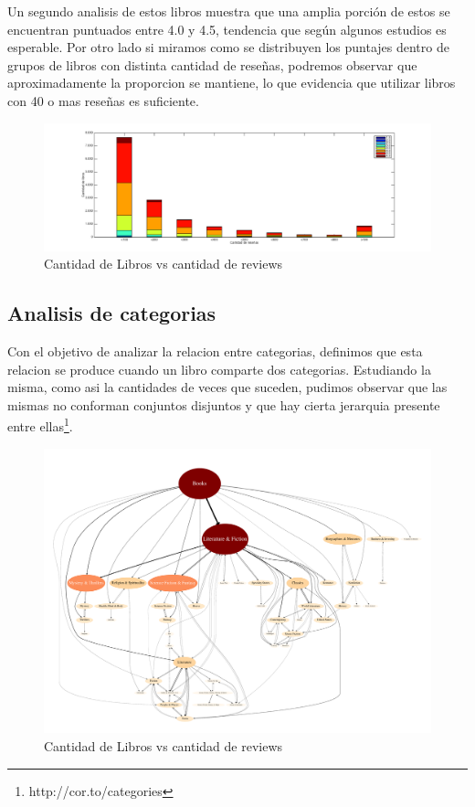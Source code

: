 \documentclass[12pt,journal,compsoc]{IEEEtran}
\begin{document}
Un segundo analisis de estos libros muestra que una amplia porción de estos se encuentran puntuados entre 4.0 y 4.5, tendencia que según algunos estudios es esperable\cite{zhang}. Por otro lado si miramos como se distribuyen los puntajes dentro de grupos de libros con distinta cantidad de reseñas, podremos observar que aproximadamente la proporcion se mantiene, lo que evidencia que utilizar libros con 40 o mas reseñas es suficiente.

\begin{figure}[H]
  \includegraphics[width=7.0in]{imgs/cantLibrosVScantReviews.png}
  \caption{Cantidad de Libros vs cantidad de reviews}
\end{figure}

\subsection{Analisis de categorias}

Con el objetivo de analizar la relacion entre categorias, definimos que esta relacion se produce cuando un libro comparte dos categorias. Estudiando la misma, como asi la cantidades de veces que suceden, pudimos observar que las mismas no conforman conjuntos disjuntos y que hay cierta jerarquia presente entre ellas\footnote{http://cor.to/categories}.

\begin{figure}[H]
  \centering
  \includegraphics[width=7.0in]{../results/graph.pdf}
  \caption{Cantidad de Libros vs cantidad de reviews}
\end{figure}
\end{document}

